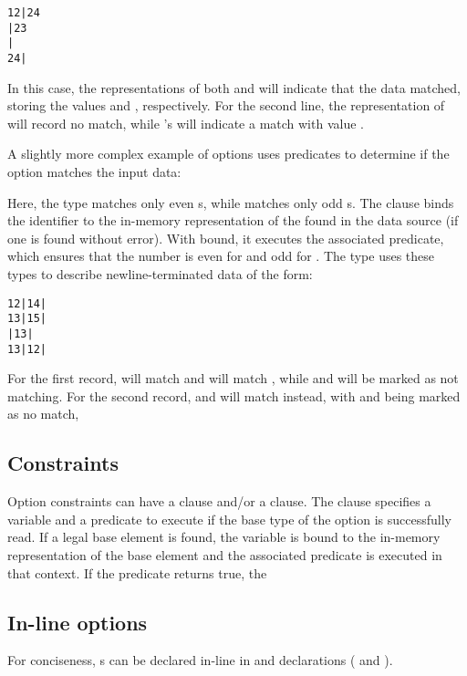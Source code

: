 \begin{verbatim}
12|24
|23
|
24|
\end{verbatim}
\noindent
In this case, the representations of both  and  will
indicate that the data matched, storing the values  and
, respectively.  For the second line, the representation of
 will record no match, while 's will indicate a match with
value . 

A slightly more complex example of options uses predicates to
determine if the option matches the input data:


\noindent
Here, the type  matches only even s, while
 matches only odd s.  The \Psome{} clause binds
the identifier  to the in-memory representation of the
 found in the data source (if one is found without
error).  With  bound, it executes the associated predicate,
which ensures that the number is even for  and odd for
. 
The type  uses
these types to describe newline-terminated data of the form:
\begin{verbatim}
12|14|
13|15|
|13|
13|12|
\end{verbatim}
For the first record,  will match  and  will
match , while  and  will be marked as not
matching. For the second record,  and  will match 
instead, with  and  being marked as no match, \etc{}


\subsection{Constraints}
\label{sec:opt-constraints}
Option constraints can have a \Psome{} clause and/or a \Pnone{}
clause.  The \Psome{} clause specifies a variable and a predicate to
execute if the base type of the option is successfully read.  If a
legal base element is found, the variable is bound to the in-memory
representation of the base element and the associated predicate is
executed in that context.  If the predicate returns true, the

\subsection{In-line options}
For conciseness, \Popt{}s can be declared in-line in \Pstruct{} and \Punion{}
declarations (\cf{}  and
).


